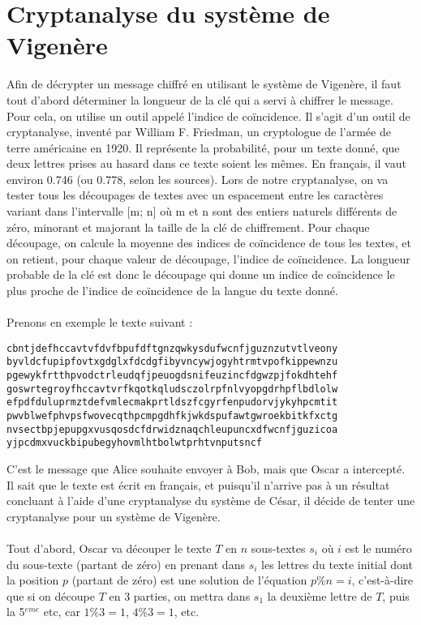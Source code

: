 	\section{Cryptanalyse du système de Vigenère}
		Afin de décrypter un message chiffré en utilisant le système de Vigenère, il faut tout d’abord déterminer la longueur de la clé qui a servi à chiffrer le message. Pour cela, on utilise un outil appelé l’indice de coïncidence.
		Il s’agit d’un outil de cryptanalyse, inventé par William F. Friedman, un cryptologue de l’armée de terre américaine en 1920. Il représente la probabilité, pour un texte donné, que deux lettres prises au hasard dans ce texte soient les mêmes.
		En français, il vaut environ 0.746 (ou 0.778, selon les sources).
		Lors de notre cryptanalyse, on va tester tous les découpages de textes avec un espacement entre les caractères variant dans l’intervalle [m; n] où m et n sont des entiers naturels différents de zéro, minorant et majorant la taille de la clé de chiffrement. Pour chaque découpage, on calcule la moyenne des indices de coïncidence de tous les textes, et on retient, pour chaque valeur de découpage, l’indice de coïncidence. La longueur probable de la clé est donc le découpage qui donne un indice de coïncidence le plus proche de l’indice de coïncidence de la langue du texte donné.\\
		\\
		Prenons en exemple le texte suivant :
		\begin{lstlisting}
cbntjdefhccavtvfdvfbpufdftgnzqwkysdufwcnfjguznzutvtlveony
byvldcfupipfovtxgdglxfdcdgfibyvncywjogyhtrmtvpofkippewnzu
pgewykfrtthpvodctrleudqfjpeuogdsnifeuzincfdgwzpjfokdhtehf
goswrtegroyfhccavtvrfkqotkqludsczolrpfnlvyopgdrhpflbdlolw
efpdfduluprmztdefvmlecmakprtldszfcgyrfenpudorvjykyhpcmtit
pwvblwefphvpsfwovecqthpcmpgdhfkjwkdspufawtgwroekbitkfxctg
nvsectbpjepupgxvusqosdcfdrwidznaqchleupuncxdfwcnfjguzicoa
yjpcdmxvuckbipubegyhovmlhtbolwtprhtvnputsncf
		\end{lstlisting}
		C'est le message que Alice souhaite envoyer à Bob, mais que Oscar a intercepté. Il sait que le texte est écrit en français, et puisqu'il n'arrive pas à un résultat concluant à l'aide d'une cryptanalyse du système de César, il décide de tenter une cryptanalyse pour un système de Vigenère.\\
		\\
		Tout d'abord, Oscar va découper le texte $T$ en $n$ sous-textes $s_i$ où $i$ est le numéro du sous-texte (partant de zéro) en prenant dans $s_i$ les lettres du texte initial dont la position $p$ (partant de zéro) est une solution de l'équation $p \% n = i$, c'est-à-dire que si on découpe $T$ en 3 parties, on mettra dans $s_1$ la deuxième lettre de $T$, puis la 5$^{eme}$ etc, car $1 \% 3 = 1$, $4 \% 3 = 1$, etc.\\
